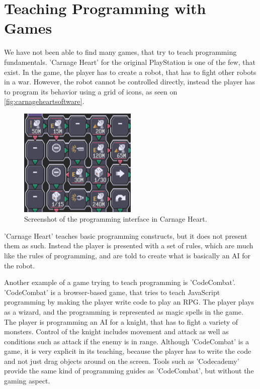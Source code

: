 \section{Teaching Programming with Games}
\label{sec:teachProgWithGames}
We have not been able to find many games, that try to teach programming fundamentals. 'Carnage Heart' for the original PlayStation is one of the few, that exist. In the game, the player has to create a robot, that has to fight other robots in a war. However, the robot cannot be controlled directly, instead the player has to program its behavior using a grid of icons, as seen on \autoref{fig:carnageheartsoftware}.

\begin{figure}[h]
  \centering
    \includegraphics[width=0.5\textwidth]{img/CarnageHeartSoftware.png}
  \caption{Screenshot of the programming interface in Carnage Heart.\cite{carnageheartsoftware}}
  \label{fig:carnageheartsoftware}
\end{figure}

'Carnage Heart' teaches basic programming constructs, but it does not present them as such. Instead the player is presented with a set of rules, which are much like the rules of programming, and are told to create what is basically an AI for the robot.\newline

Another example of a game trying to teach programming is 'CodeCombat'. \cite{codecombat} 'CodeCombat' is a browser-based game, that tries to teach JavaScript programming by making the player write code to play an RPG. The player plays as a wizard, and the programming is represented as magic spells in the game. The player is programming an AI for a knight, that has to fight a variety of monsters. Control of the knight includes movement and attack as well as conditions such as attack if the enemy is in range.
Although 'CodeCombat' is a game, it is very explicit in its teaching, because the player has to write the code and not just drag objects around on the screen. Tools such as 'Codecademy' provide the same kind of programming guides as 'CodeCombat', but without the gaming aspect.\cite{codecademy}\newline


